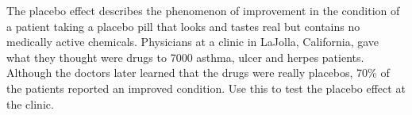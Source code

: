 
\begin{exercise}

The placebo effect describes the phenomenon of improvement in the condition
of a patient taking a placebo pill that looks and tastes real but contains
no medically active chemicals. Physicians at a clinic in LaJolla, California,
gave what they thought were drugs to 7000 asthma, ulcer and herpes patients.
Although the doctors later learned that the drugs were really placebos,
70\% of the patients reported an improved condition.
Use this to test the placebo effect at the clinic.

\end{exercise}


\begin{solution}

\phantom{s}

\end{solution}

